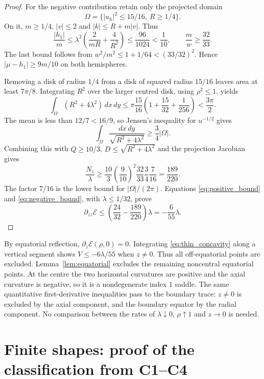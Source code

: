 \begin{proof}
For the negative contribution retain only the projected domain
\[
 \Omega=\{|u_h|^2\le15/16,\ R\ge1/4\}.
\]
On it, $m\ge1/4$, $|v|\le2$ and $|k|\le R+m|v|$. Thus
\[
 \frac{|h_1|}{m}\le\lambda^2\left(\frac2{mR}+\frac4{R^2}\right)
 \le\frac{96}{1024}<\frac1{10},\qquad \frac m w\ge\frac{32}{33}.
\]
The last bound follows from $w^2/m^2\le1+1/64<(33/32)^2$. Hence $|\mu-h_1|\ge9m/10$ on both hemispheres.

Removing a disk of radius $1/4$ from a disk of squared radius $15/16$ leaves area at least $7\pi/8$. Integrating $R^2$ over the larger centred disk, using $\rho^2\le1$, yields
\[
 \int_\Omega(R^2+4\lambda^2)\,dx\,dy
 \le\pi\frac{15}{16}\left(1+\frac{15}{32}+\frac1{256}\right)<\frac{3\pi}{2}.
\]
The mean is less than $12/7<16/9$, so Jensen's inequality for $u^{-1/2}$ gives
\[
 \int_\Omega\frac{dx\,dy}{\sqrt{R^2+4\lambda^2}}\ge\frac34|\Omega|.
\]
Combining this with $Q\ge10/3$, $D\le\sqrt{R^2+4\lambda^2}$ and the projection Jacobian gives
\begin{equation}\label{eq:negative_bound}
 \frac{N_z}{\lambda}\ge\frac{10}{3}\left(\frac9{10}\right)^2
 \frac{32}{33}\frac34\frac7{16}=\frac{189}{220}.
\end{equation}
The factor $7/16$ is the lower bound for $|\Omega|/(2\pi)$. Equations \eqref{eq:positive_bound} and \eqref{eq:negative_bound}, with $\lambda\le1/32$, prove
\[
 \partial_{zz}\mathcal E\le\left(\frac{24}{32}-\frac{189}{220}\right)\lambda=-\frac6{55}\lambda.
\]
\end{proof}

By equatorial reflection, $\partial_z\mathcal E(\rho,0)=0$. Integrating \eqref{eq:thin_concavity} along a vertical segment shows $V\le-6\lambda/55$ when $z\ne0$. Thus all off-equatorial points are excluded. Lemma~\ref{lem:equatorial} excludes the remaining noncentral equatorial points. At the centre the two horizontal curvatures are positive and the axial curvature is negative, so it is a nondegenerate index 1 saddle. The same quantitative first-derivative inequalities pass to the boundary trace: $z\ne0$ is excluded by the axial component, and the boundary equator by the radial component. No comparison between the rates of $\lambda\downarrow0$, $\rho\uparrow1$ and $z\to0$ is needed.

\section{Finite shapes: proof of the classification from C1--C4}\label{sec:finite_assembly}

